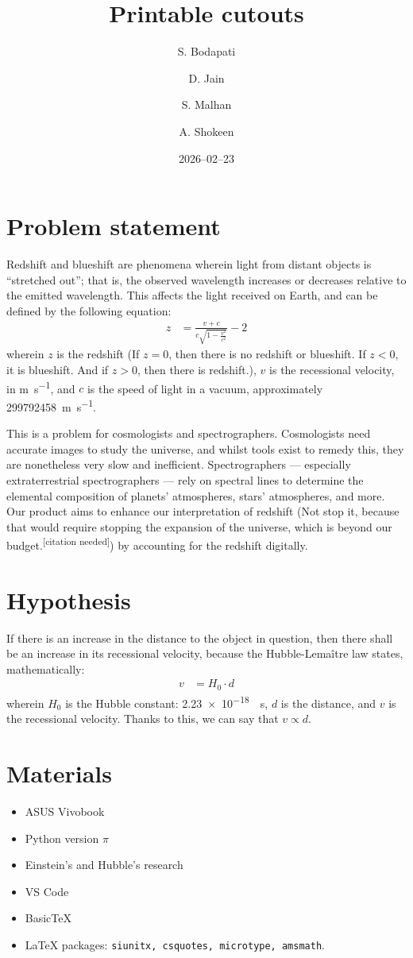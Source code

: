 \documentclass[a4paper, 17pt]{extarticle}
\title{Printable cutouts}
\date{2026--02--23}
\author{S. Bodapati \and D. Jain \and S. Malhan \and A. Shokeen}
\begin{document}
\section{Problem statement}
Redshift and blueshift are phenomena wherein light from distant objects is ``stretched out''; that is, the observed wavelength increases or decreases relative to the emitted wavelength. This affects the light received on Earth, and can be defined by the following equation:
\begin{align}
    z &= \frac{v + c}{c\sqrt{1 - \frac{v^2}{c^2}}} - 2
\end{align}
wherein \(z\) is the redshift (If \(z = 0\), then there is no redshift or blueshift. If \(z < 0\), it is blueshift. And if \(z > 0\), then there is redshift.), \(v\) is the recessional velocity, in \unit{\metre\per\second}, and \(c\) is the speed of light in a vacuum, approximately \qty{299 792 458}{\metre\per\second}.

This is a problem for cosmologists and spectrographers. Cosmologists need accurate images to study the universe, and whilst tools exist to remedy this, they are nonetheless very slow and inefficient. Spectrographers --- especially extraterrestrial spectrographers --- rely on spectral lines to determine the elemental composition of planets' atmospheres, stars' atmospheres, and more. Our product aims to enhance our interpretation of redshift (Not stop it, because that would require stopping the expansion of the universe, which is beyond our budget.\textsuperscript{[citation needed]}) by accounting for the redshift digitally.

{\Large \section{Hypothesis}
If there is an increase in the distance to the object in question, then there shall be an increase in its recessional velocity, because the Hubble-Lemaître law states, mathematically:
\begin{align}
    v &= H_0 \cdot d
\end{align}
wherein \(H_0\) is the Hubble constant: \qty{2.23e-18}{\per\second}, \(d\) is the distance, and \(v\) is the recessional velocity. Thanks to this, we can say that \(v \propto d\).}

\newpage

{\Large \section{Materials}
\begin{itemize}
    \item ASUS Vivobook
    \item Python version \(\pi\)
    \item Einstein's and Hubble's research
    \item VS Code
    \item Basic\TeX
    \item \LaTeX{} packages: \verb|siunitx, csquotes, microtype, amsmath|.
\end{itemize}}
\end{document}
